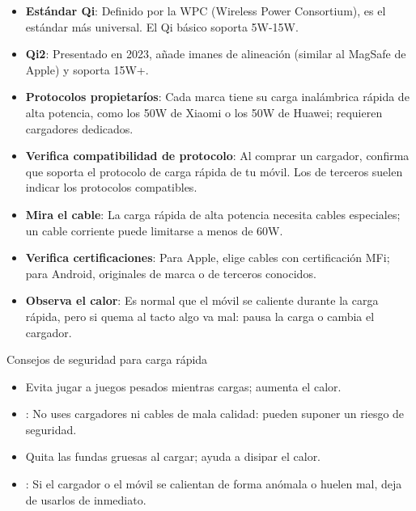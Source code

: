 \begin{itemize}
  \item \textbf{Estándar Qi}: Definido por la WPC (Wireless Power Consortium), es el estándar más universal. El Qi básico soporta 5W-15W.
  \item \textbf{Qi2}: Presentado en 2023, añade imanes de alineación (similar al MagSafe de Apple) y soporta 15W+.
  \item \textbf{Protocolos propietaríos}: Cada marca tiene su carga inalámbrica rápida de alta potencia, como los 50W de Xiaomi o los 50W de Huawei; requieren cargadores dedicados.
\end{itemize}


\begin{itemize}
  \item \textbf{Verifica compatibilidad de protocolo}: Al comprar un cargador, confirma que soporta el protocolo de carga rápida de tu móvil. Los de terceros suelen indicar los protocolos compatibles.
  \item \textbf{Mira el cable}: La carga rápida de alta potencia necesita cables especiales; un cable corriente puede limitarse a menos de 60W.
  \item \textbf{Verifica certificaciones}: Para Apple, elige cables con certificación MFi; para Android, originales de marca o de terceros conocidos.
  \item \textbf{Observa el calor}: Es normal que el móvil se caliente durante la carga rápida, pero si quema al tacto algo va mal: pausa la carga o cambia el cargador.
\end{itemize}

\begin{tcbwarn}{Consejos de seguridad para carga rápida}
\begin{itemize}
  \item Evita jugar a juegos pesados mientras cargas; aumenta el calor.
  \item : No uses cargadores ni cables de mala calidad: pueden suponer un riesgo de seguridad.
  \item Quita las fundas gruesas al cargar; ayuda a disipar el calor.
  \item : Si el cargador o el móvil se calientan de forma anómala o huelen mal, deja de usarlos de inmediato.
\end{itemize}

\end{tcbwarn}

